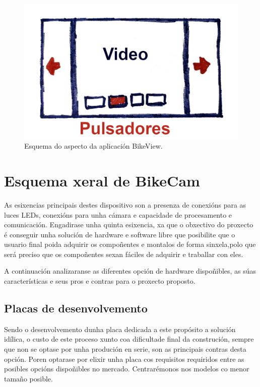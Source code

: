 \begin{figure}[tbp]
  \centering
  \includegraphics[scale=0.4]{imaxes/bikeview.jpg}
  \caption{Esquema do aspecto da aplicación BikeView.}
  \label{fig:bikeview}
\end{figure}

\section{Esquema xeral de BikeCam}


As esixencias principais destes dispositivo son a presenza de conexións para as luces LEDs, conexións para unha cámara e capacidade de procesamento e comunicación. Engadirase unha quinta esixencia, xa que o obxectivo do proxecto é conseguir unha solución de hardware e software libre que posibilite que o usuario final poida adquirir os compoñentes e montalos de forma sinxela,polo que será preciso que os compoñentes sexan fáciles de adquirir e traballar con eles.

A continuación analizaranse as diferentes opción de hardware dispoñibles, as súas características e seus pros e contras para o proxecto proposto.

\subsection{Placas de desenvolvemento}


Sendo o desenvolvemento dunha placa dedicada a este propósito a solución idílica, o custo de este proceso xunto coa dificultade final da construción, sempre que non se optase por unha produción en serie, son as principais contras desta opción. Poren optarase por elixir unha placa cos requisitos requiridos entre as posibles opcións dispoñibles no mercado. Centrarémonos nos modelos co menor tamaño posible.

